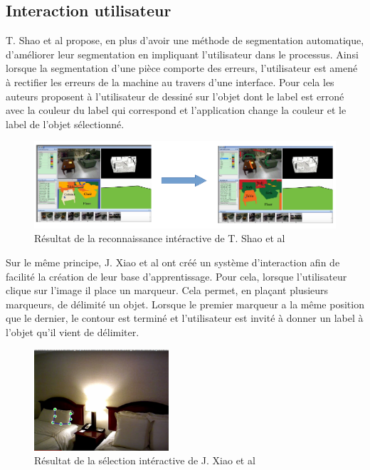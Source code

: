 \subsection{Interaction utilisateur}
T. Shao et al\cite{interactiveSeg} propose, en plus d'avoir une méthode de segmentation automatique, d'améliorer leur 
segmentation en impliquant l'utilisateur dans le processus. Ainsi lorsque la segmentation d'une pièce comporte des erreurs, 
l'utilisateur est amené à rectifier les erreurs de la machine au travers d'une interface.
Pour cela les auteurs proposent à l'utilisateur de dessiné sur l'objet dont le label est erroné avec la couleur du label 
qui correspond et l'application change la couleur et le label de l'objet sélectionné.\\ 

\begin{figure}[!ht]
  \begin{center}
    \includegraphics[width=15cm]{image/recoInteractive1.png}
    \caption{Résultat de la reconnaissance intéractive de T. Shao et al\cite{interactiveSeg}}
  \end{center}
\end{figure}

Sur le même principe, J. Xiao et al\cite{interactionSeg2}
ont créé un système d'interaction afin de facilité la création de leur base d'apprentissage. Pour cela, lorsque l'utilisateur 
clique sur l'image il place un marqueur. Cela permet, en plaçant plusieurs marqueurs, de délimité un objet. Lorsque le premier
marqueur a la même position que le dernier, le contour est terminé et l'utilisateur est invité à donner un label à l'objet
qu'il vient de délimiter.

\begin{figure}[!ht]
  \begin{center}
    \includegraphics[width=5cm]{image/segInteractive1.png}
    \caption{Résultat de la sélection intéractive de J. Xiao et al\cite{interactionSeg2}}
  \end{center}
\end{figure}
